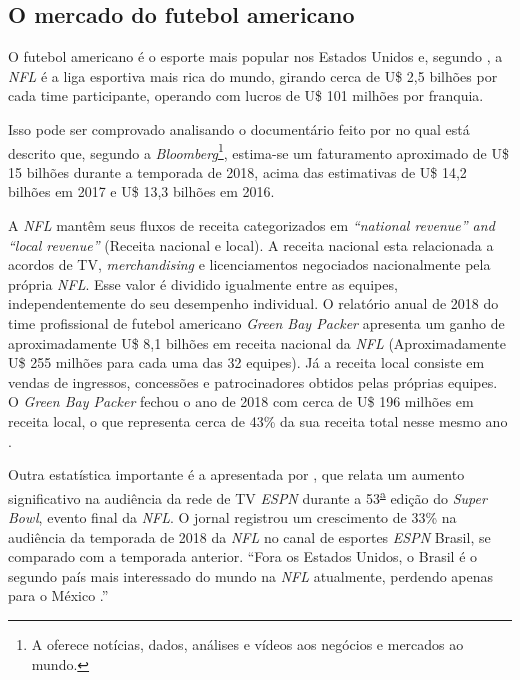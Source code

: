 \subsection{O mercado do futebol americano}
\label{mercado-do-futebol-americano}

O futebol americano é o esporte mais popular nos Estados Unidos e, segundo , a \textit{NFL} é a liga esportiva mais rica do mundo, girando cerca de U\$ 2,5 bilhões por cada time participante, operando com lucros de U\$ 101 milhões por franquia.

Isso pode ser comprovado analisando o documentário feito por  no qual está descrito que, segundo a \textit{Bloomberg}\footnote{A  oferece notícias, dados, análises e vídeos aos negócios e mercados ao mundo.\label{Bloomberg}}, estima-se um faturamento aproximado de U\$ 15 bilhões durante a temporada de 2018, acima das estimativas de U\$ 14,2 bilhões em 2017 e U\$ 13,3 bilhões em 2016.


A \textit{NFL} mantêm seus fluxos de receita categorizados em \textit{“national revenue” and “local revenue”} (Receita nacional e local). A receita nacional esta relacionada a acordos de TV, \textit{merchandising} e licenciamentos negociados nacionalmente pela própria \textit{NFL}.  Esse valor é dividido igualmente entre as equipes, independentemente do seu desempenho individual. O relatório anual de 2018 do time profissional de futebol americano \textit{Green Bay Packer} apresenta um ganho de aproximadamente U\$ 8,1 bilhões em receita nacional da \textit{NFL} (Aproximadamente  U\$ 255 milhões para cada uma das 32 equipes). Já a receita local consiste em vendas de ingressos, concessões e patrocinadores obtidos pelas próprias equipes. O \textit{Green Bay Packer} fechou o ano de 2018 com cerca de U\$ 196 milhões em receita local, o que representa cerca de 43\% da sua receita total nesse mesmo ano \cite{INVESTOPEDIA2019}.

Outra estatística importante é a apresentada por , que relata um aumento significativo na audiência da rede de TV \textit{ESPN} durante a 53\textsuperscript{\underline{a}} edição do \textit{Super Bowl}, evento final da \textit{NFL}. O jornal  registrou um crescimento de 33\% na audiência da temporada de 2018 da \textit{NFL} no canal de esportes \textit{ESPN} Brasil, se comparado com a temporada anterior. “Fora os Estados Unidos, o Brasil é o segundo país mais interessado do mundo na \textit{NFL} atualmente, perdendo apenas para o México \cite{FOLHASP2019}.”